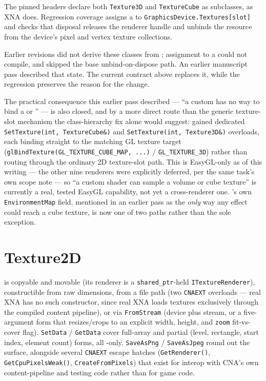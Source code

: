The pinned headers declare both \texttt{Texture3D} and \texttt{TextureCube} as
 subclasses, as XNA does. Regression coverage assigns a
 to \texttt{GraphicsDevice.Textures[slot]} and checks that disposal releases
the renderer handle and unbinds the resource from the device's pixel and vertex texture
collections.

\begin{historynote}
Earlier revisions did not derive these classes from ; assignment to a
 could not compile, and  skipped the base
unbind-on-dispose path. An earlier manuscript pass described that state. The current contract
above replaces it, while the regression preserves the reason for the change.
\end{historynote}

The practical consequence this earlier pass described --- ``a custom
 has no way to bind a  or ''
--- is also closed, and by a more direct route than the generic texture-slot mechanism the
class-hierarchy fix alone would suggest:  gained dedicated
\texttt{SetTexture(int, TextureCube\&)} and \texttt{SetTexture(int, Texture3D\&)}
overloads, each binding straight to the matching GL texture target
(\texttt{glBindTexture(GL\_TEXTURE\_CUBE\_MAP, ...)} / \texttt{GL\_TEXTURE\_3D}) rather than
routing through the ordinary 2D texture-slot path. This is EasyGL-only as of this writing ---
the other nine renderers were explicitly deferred, per the same task's own scope note --- so
``a custom shader can sample a volume or cube texture'' is currently a real, tested EasyGL
capability, not yet a cross-renderer one. 's own
\texttt{EnvironmentMap} field, mentioned in an earlier pass as the \emph{only} way any effect
could reach a cube texture, is now one of two paths rather than the sole exception.

\section{Texture2D}

 is copyable and movable (its renderer is a \texttt{shared\_ptr}-held
\texttt{ITextureRenderer}), constructible from raw dimensions, from a file path (two
\texttt{CNAEXT} overloads --- real XNA has no such constructor, since real XNA loads textures
exclusively through the compiled content pipeline), or via \texttt{FromStream} (device plus
stream, or a five-argument form that resizes/crops to an explicit width, height, and
\texttt{zoom} fit-vs-cover flag). \texttt{SetData} / \texttt{GetData} cover full-array and
partial (level, rectangle, start index, element count) forms, all -only.
\texttt{SaveAsPng} / \texttt{SaveAsJpeg} round out the surface, alongside several
\texttt{CNAEXT} escape hatches (\texttt{GetRenderer()}, \texttt{GetCpuPixelsWeak()},
\texttt{CreateFromPixels}) that exist for interop with CNA's own content-pipeline and testing
code rather than for game code.

